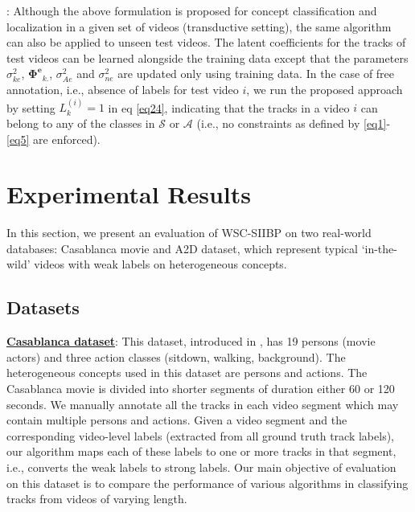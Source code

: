 \documentclass[runningheads]{llncs}
\begin{document}
: Although the above formulation is proposed for concept classification and localization in a given set of videos (transductive setting), the same algorithm can also be applied to unseen test videos. The latent coefficients for the tracks of test videos can be learned alongside the training data except that the parameters $\sigma_{ke}^2$, $\mathbf{\Phi^e}_{k.}$, $\sigma_{Ae}^2$ and $\sigma_{ne}^2$ are updated only using training data. In the case of free annotation, i.e., absence of labels for test video $i$, we run the proposed approach by setting $L^{(i)}_k = 1$ in eq \eqref{eq24}, indicating that the tracks in a video $i$ can belong to any of the classes in $\mathcal{S}$ or $\mathcal{A}$ (i.e., no constraints as defined by \eqref{eq1}-\eqref{eq5} are enforced). 

\section{Experimental Results}
\label{sec:experimental_results}

In this section, we present an evaluation of WSC-SIIBP on two real-world databases: Casablanca movie and A2D dataset, which represent typical `in-the-wild' videos with weak labels on heterogeneous concepts.

\subsection{Datasets}
\label{sec:tracks_and_features}

\noindent
\underline{\bf Casablanca dataset}: This dataset, introduced in \cite{bojanowski2013finding}, has 19 persons (movie actors) and three action classes (sitdown, walking, background). The heterogeneous concepts used in this dataset are persons and actions. The Casablanca movie is divided into shorter segments of duration either 60 or 120 seconds. We manually annotate all the tracks in each video segment which may contain multiple persons and actions.
Given a video segment and the corresponding video-level labels (extracted from all ground truth track labels), our algorithm maps each of these labels to one or more tracks in that segment, i.e., converts the weak labels to strong labels. Our main objective of evaluation on this dataset is to compare the performance of various algorithms in classifying tracks from videos of varying length.
\end{document}
